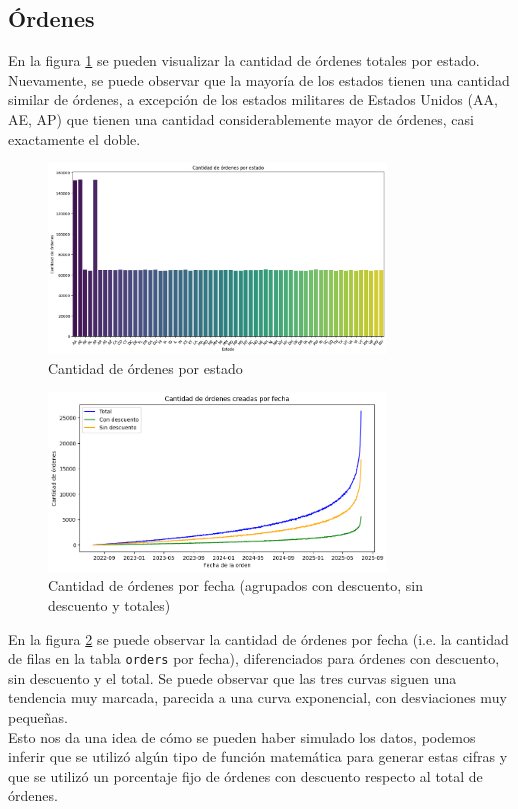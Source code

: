 \subsection{Órdenes}

En la figura \ref{fig:ordenes_por_estado} se pueden visualizar la cantidad de órdenes totales por estado. Nuevamente, se puede observar que la mayoría de los estados tienen una cantidad similar de órdenes, a excepción de los estados militares de Estados Unidos (AA, AE, AP) que tienen una cantidad considerablemente mayor de órdenes, casi exactamente el doble.

\begin{figure}[H]
    \centering
    \includegraphics[width=0.8\textwidth]{imagenes/datos_uniformes/ordenes_por_estado.png}
    \caption{Cantidad de órdenes por estado}
    \label{fig:ordenes_por_estado}
\end{figure}

\begin{figure}[H]
    \centering
    \includegraphics[width=0.8\textwidth]{imagenes/datos_uniformes/cantidad_de_ordenes_por_fecha.png}
    \caption{Cantidad de órdenes por fecha (agrupados con descuento, sin descuento y totales)}
    \label{fig:cantidad_de_ordenes_por_fecha}
\end{figure}

En la figura \ref{fig:cantidad_de_ordenes_por_fecha} se puede observar la cantidad de órdenes por fecha (i.e. la cantidad de filas en la tabla \texttt{orders} por fecha), diferenciados para órdenes con descuento, sin descuento y el total. Se puede observar que las tres curvas siguen una tendencia muy marcada, parecida a una curva exponencial, con desviaciones muy pequeñas. \\
Esto nos da una idea de cómo se pueden haber simulado los datos, podemos inferir que se utilizó algún tipo de función matemática para generar estas cifras y que se utilizó un porcentaje fijo de órdenes con descuento respecto al total de órdenes.


